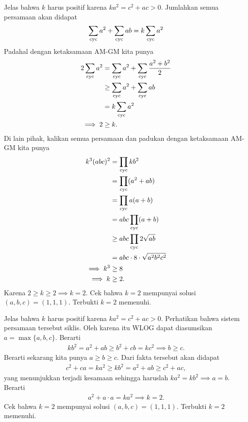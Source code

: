 

\begin{solusi}[1]
    Jelas bahwa $k$ harus positif karena $ka^2 = c^2+ac > 0$. Jumlahkan semua persamaan akan didapat
    \begin{align*}
        \sum_{\mathrm{cyc}} a^2 + \sum_{\mathrm{cyc}} ab = k\sum_{\mathrm{cyc}} a^2
    \end{align*}
    Padahal dengan ketaksamaan AM-GM kita punya
    \begin{align*}
        2\sum_{\mathrm{cyc}} a^2 &= \sum_{\mathrm{cyc}} a^2 + \sum_{\mathrm{cyc}} \dfrac{a^2+b^2}{2}\\ 
        &\ge \sum_{\mathrm{cyc}} a^2 + \sum_{\mathrm{cyc}} ab\\
        &= k\sum_{\mathrm{cyc}} a^2\\
        \implies 2 &\ge k.
    \end{align*}
    Di lain pihak, kalikan semua persamaan dan padukan dengan ketaksamaan AM-GM kita punya 
    \begin{align*}
        k^3(abc)^2 &= \prod_{\mathrm{cyc}} kb^2\\
        &= \prod_{\mathrm{cyc}} (a^2+ab)\\
        &= \prod_{\mathrm{cyc}} a(a+b)\\
        &= abc\prod_{\mathrm{cyc}}(a+b)\\
        &\ge abc\prod_{\mathrm{cyc}} 2\sqrt{ab}\\
        &= abc \cdot 8 \cdot \sqrt{a^2b^2c^2}\\
        \implies k^3 &\ge 8\\ 
        \implies k &\ge 2.
    \end{align*}
    Karena $2 \ge k \ge 2 \implies k=2$. Cek bahwa $k=2$ mempunyai solusi $(a,b,c)=(1,1,1)$. Terbukti $k=2$ memenuhi.
\end{solusi} 

\begin{solusi}[2]
    Jelas bahwa $k$ harus positif karena $ka^2 = c^2+ac > 0$. Perhatikan bahwa sistem persamaan tersebut siklis. Oleh karena itu WLOG dapat diasumsikan $a = \max\{a,b,c\}$. Berarti
    \begin{align*}
        kb^2 = a^2+ab \ge b^2+cb = kc^2 \implies b \ge c.
    \end{align*}
    Berarti sekarang kita punya $a \ge b \ge c$. Dari fakta tersebut akan didapat
    \begin{align*}
        c^2+ca = ka^2  \ge kb^2 = a^2+ab \ge c^2+ac,
    \end{align*}
    yang menunjukkan terjadi kesamaan sehingga haruslah $ka^2=kb^2 \implies a=b$. Berarti
    \begin{align*}
        a^2+a\cdot a = ka^2 \implies k=2.
    \end{align*}
    Cek bahwa $k=2$ mempunyai solusi $(a,b,c)=(1,1,1)$. Terbukti $k=2$ memenuhi.
\end{solusi}